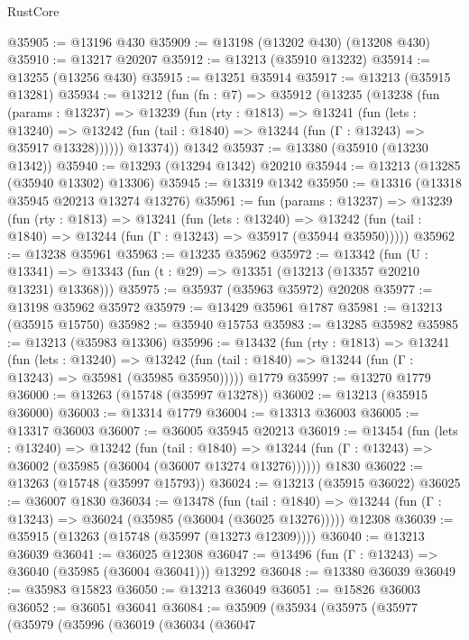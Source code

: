 \begin{lexlean}{RustCore}
\begin{coremodule}
@35905 := @13196 @430
@35909 := @13198 (@13202 @430) (@13208 @430)
@35910 := @13217 @20207
@35912 := @13213 (@35910 @13232)
@35914 := @13255 (@13256 @430)
@35915 := @13251 @35914
@35917 := @13213 (@35915 @13281)
@35934 := @13212
    (fun (fn : @7) =>
    @35912
      (@13235
        (@13238
          (fun (params : @13237) =>
          @13239
            (fun (rty : @1813) =>
            @13241
              (fun (lets : @13240) =>
              @13242 (fun (tail : @1840) => @13244 (fun (Γ : @13243) => @35917 @13328))))))
        @13374))
    @1342
@35937 := @13380 (@35910 (@13230 @1342))
@35940 := @13293 (@13294 @1342) @20210
@35944 := @13213 (@13285 (@35940 @13302) @13306)
@35945 := @13319 @1342
@35950 := @13316 (@13318 @35945 @20213 @13274 @13276)
@35961 := fun (params : @13237) =>
  @13239
    (fun (rty : @1813) =>
    @13241
      (fun (lets : @13240) =>
      @13242 (fun (tail : @1840) => @13244 (fun (Γ : @13243) => @35917 (@35944 @35950)))))
@35962 := @13238 @35961
@35963 := @13235 @35962
@35972 := @13342
    (fun (U : @13341) => @13343 (fun (t : @29) => @13351 (@13213 (@13357 @20210 @13231) @13368)))
@35975 := @35937 (@35963 @35972) @20208
@35977 := @13198 @35962 @35972
@35979 := @13429 @35961 @1787
@35981 := @13213 (@35915 @15750)
@35982 := @35940 @15753
@35983 := @13285 @35982
@35985 := @13213 (@35983 @13306)
@35996 := @13432
    (fun (rty : @1813) =>
    @13241
      (fun (lets : @13240) =>
      @13242 (fun (tail : @1840) => @13244 (fun (Γ : @13243) => @35981 (@35985 @35950)))))
    @1779
@35997 := @13270 @1779
@36000 := @13263 (@15748 (@35997 @13278))
@36002 := @13213 (@35915 @36000)
@36003 := @13314 @1779
@36004 := @13313 @36003
@36005 := @13317 @36003
@36007 := @36005 @35945 @20213
@36019 := @13454
    (fun (lets : @13240) =>
    @13242
      (fun (tail : @1840) =>
      @13244 (fun (Γ : @13243) => @36002 (@35985 (@36004 (@36007 @13274 @13276))))))
    @1830
@36022 := @13263 (@15748 (@35997 @15793))
@36024 := @13213 (@35915 @36022)
@36025 := @36007 @1830
@36034 := @13478
    (fun (tail : @1840) => @13244 (fun (Γ : @13243) => @36024 (@35985 (@36004 (@36025 @13276)))))
    @12308
@36039 := @35915 (@13263 (@15748 (@35997 (@13273 @12309))))
@36040 := @13213 @36039
@36041 := @36025 @12308
@36047 := @13496 (fun (Γ : @13243) => @36040 (@35985 (@36004 @36041))) @13292
@36048 := @13380 @36039
@36049 := @35983 @15823
@36050 := @13213 @36049
@36051 := @15826 @36003
@36052 := @36051 @36041
@36084 := @35909
    (@35934
      (@35975
        (@35977
          (@35979
            (@35996
              (@36019
                (@36034
                  (@36047

\end{coremodule}
\end{lexlean}
